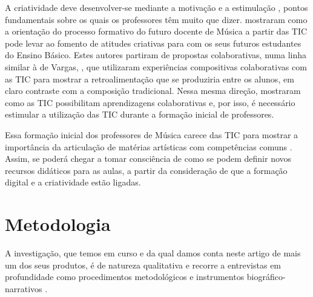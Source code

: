 \documentclass{textolivre}
\begin{document}
A criatividade deve desenvolver-se mediante a motivação e a estimulação
\cite{torres2017}, pontos fundamentais sobre os quais os professores têm muito que
dizer. \textcite{galera2011} mostraram como a orientação do processo
formativo do futuro docente de Música a partir das TIC pode levar ao fomento de
atitudes criativas para com os seus futuros estudantes do Ensino Básico. Estes
autores partiram de propostas colaborativas, numa linha similar à de Vargas,
\textcite{vargas}, que utilizaram experiências compositivas
colaborativas com as TIC para mostrar a retroalimentação que se produziria
entre os alunos, em claro contraste com a composição tradicional. Nessa mesma
direção, \textcite{acosta2019} mostraram como as TIC
possibilitam aprendizagens colaborativas e, por isso, é necessário estimular a
utilização das TIC durante a formação inicial de professores.

Essa formação inicial dos professores de Música carece das TIC para mostrar a
importância da articulação de matérias artísticas com competências comuns
\cite{martinpinol2016}. Assim, se poderá
chegar a tomar consciência de como se podem definir novos recursos didáticos
para as aulas, a partir da consideração de que a formação digital e a
criatividade estão ligadas.


\section{Metodologia}\label{sec-metodologia}

A investigação, que temos em curso e da qual damos conta neste artigo de mais
um dos seus produtos, é de natureza qualitativa e recorre a entrevistas em
profundidade como procedimentos metodológicos e instrumentos
biográfico-narrativos \cite{goodson2016,huhn2009,landinmiranda2019,edwards2013}.
\end{document}
